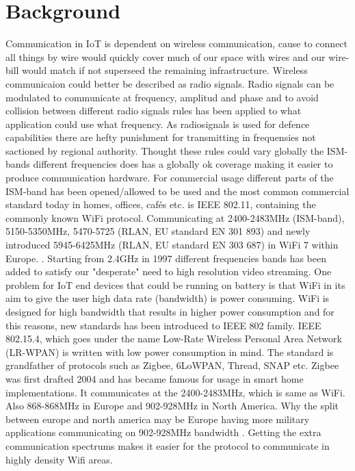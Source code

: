 \documentclass[article,a4paper]{IEEEtran}
\begin{document}
    \section{Background}
    Communication in IoT is dependent on wireless communication, cause to connect all things by wire would quickly cover much of our space with wires and our wire-bill would match if not superseed the remaining infrastructure. Wireless communicaion could better be described as radio signals. Radio signals can be modulated to communicate at frequency, amplitud and phase and to avoid collision between different radio signals rules has been applied to what application could use what frequency. As radiosignals is used for defence capabilities there are hefty punishment \cite{RFlaw} for transmitting in frequensies not sactioned by regional authority. Thought these rules could vary globally the ISM-bands different frequencies does has a globally ok coverage making it easier to produce communication hardware. For commercial usage different parts of the ISM-band has been opened/allowed to be used \cite{ISM-band1} and the most common commercial standard today in homes, offices, cafés etc. is IEEE 802.11, containing the commonly known WiFi protocol. Communicating at 2400-2483MHz (ISM-band), 5150-5350MHz, 5470-5725 (RLAN, EU standard EN 301 893) and newly introduced 5945-6425MHz (RLAN, EU standard EN 303 687) in WiFi 7 within Europe. \cite{ISM-bandEUR}. Starting from 2.4GHz in 1997 different frequencies bands has been added to satisfy our "desperate" need to high resolution video streaming. 
    \newline\newline
    One problem for IoT end devices that could be running on battery is that WiFi in its aim to give the user high data rate (bandwidth) is power consuming. WiFi is designed for high bandwidth that results in higher power consumption and for this reasons, new standards has been introduced to IEEE 802 family. 
    \newline\newline
    IEEE 802.15.4, which goes under the name Low-Rate Wireless Personal Area Network (LR-WPAN) is written with low power consumption in mind. The standard is grandfather of protocols such as Zigbee, 6LoWPAN, Thread, SNAP etc. Zigbee was first drafted 2004 and has became famous for usage in smart home implementations. It communicates at the 2400-2483MHz, which is same as WiFi. Also 868-868MHz in Europe and 902-928MHz in North America. Why the split between europe and north america may be Europe having more military applications communicating on 902-928MHz bandwidth \cite{ISM-bandEUR}. Getting the extra communication spectrums makes it easier for the protocol to communicate in highly density Wifi areas. 
\end{document}
